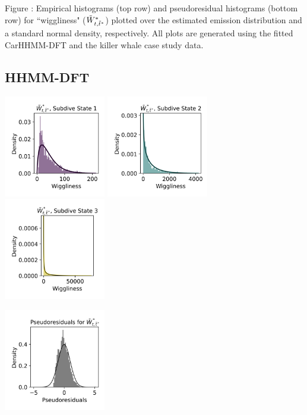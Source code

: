 \documentclass{article}
\begin{document}
        \noindent Figure : Empirical histograms (top row) and pseudoresidual histograms (bottom row) for ``wiggliness" ($\tilde{W}^*_{t,\tilde t^*}$) plotted over the estimated emission distribution and a standard normal density, respectively. All plots are generated using the fitted CarHHMM-DFT and the killer whale case study data.
        \addtocounter{fignum}{1}
        
        \subsection{HHMM-DFT}
        
        \begin{center}
        \includegraphics[width=1.75in]{../Plots/2019/20190902-182840-CATs_OB_1_0_267_HHMM_empirical_hist_ahat_0.png}
        \includegraphics[width=1.75in]{../Plots/2019/20190902-182840-CATs_OB_1_0_267_HHMM_empirical_hist_ahat_1.png}
        \includegraphics[width=1.75in]{../Plots/2019/20190902-182840-CATs_OB_1_0_267_HHMM_empirical_hist_ahat_2.png}
        
        \includegraphics[width=1.75in]{../Plots/2019/20190902-182840-CATs_OB_1_0_267_HHMM_pseudresids_ahat.png}
        \end{center}
        
\end{document}
